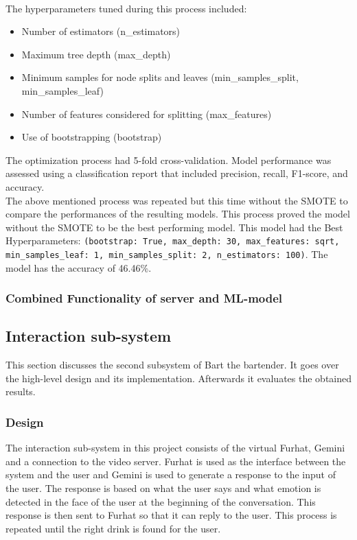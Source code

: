 \documentclass[conference]{IEEEtran}
\begin{document}
\\
The hyperparameters tuned during this process included:
\begin{itemize}
    \item Number of estimators (n\_estimators)
	\item Maximum tree depth (max\_depth)
	\item Minimum samples for node splits and leaves (min\_samples\_split, min\_samples\_leaf)
	\item Number of features considered for splitting (max\_features)
	\item Use of bootstrapping (bootstrap)
\end{itemize}	
    
The optimization process had 5-fold cross-validation.
Model performance was assessed using a classification report that included precision, recall, F1-score, and accuracy.
\\The above mentioned process was repeated but this time without the SMOTE to compare the performances of the resulting models. This process proved the model without the SMOTE to be the best performing model. This model had the Best Hyperparameters: 
\texttt{(bootstrap: True, max\_depth: 30, max\_features: sqrt, min\_samples\_leaf: 1, min\_samples\_split: 2, n\_estimators: 100)}. The model has the accuracy of 46.46\%.\\

\subsubsection{Combined Functionality of server and ML-model}

\subsection{Interaction sub-system} %
This section discusses the second subsystem of Bart the bartender. 
It goes over the high-level design and its implementation. 
Afterwards it evaluates the obtained results.

\subsubsection{Design}
The interaction sub-system in this project consists of the virtual Furhat, Gemini and a connection to the video server.
Furhat is used as the interface between the system and the user and Gemini is used to generate a response to the input of the user.
The response is based on what the user says and what emotion is detected in the face of the user at the beginning of the conversation.
This response is then sent to Furhat so that it can reply to the user.
This process is repeated until the right drink is found for the user.
\end{document}

